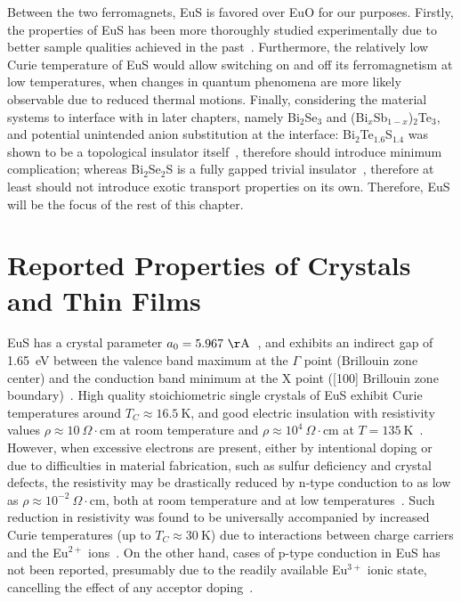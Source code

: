 Between the two ferromagnets, EuS is favored over EuO for our purposes. Firstly, the properties of EuS has been more thoroughly studied experimentally due to better sample qualities achieved in the past~\cite{EuS_band_th2}. Furthermore, the relatively low Curie temperature of EuS would allow switching on and off its ferromagnetism at low temperatures, when changes in quantum phenomena are more likely observable due to reduced thermal motions. Finally, considering the material systems to interface with in later chapters, namely Bi$_2$Se$_3$ and (Bi$_x$Sb$_{1-x}$)$_2$Te$_3$, and potential unintended anion substitution at the interface: Bi$_2$Te$_{1.6}$S$_{1.4}$ was shown to be a topological insulator itself~\cite{BiTeS}, therefore should introduce minimum complication; whereas Bi$_2$Se$_2$S is a fully gapped trivial insulator~\cite{BiSeS}, therefore at least should not introduce exotic transport properties on its own. Therefore, EuS will be the focus of the rest of this chapter.

\section{Reported Properties of Crystals and Thin Films}\label{sec:EuS_previous}
EuS has a crystal parameter $a_0=5.967~\mathrm\AA$~\cite{EuS_Shafer}, and exhibits an indirect gap of 1.65~eV between the valence band maximum at the $\Gamma$ point (Brillouin zone center) and the conduction band minimum at the X point ([100] Brillouin zone boundary)~\cite{EuX_absorption, EuS_band_th1, EuS_band_th2}. High quality stoichiometric single crystals of EuS exhibit Curie temperatures around $T_C\approx16.5~\mathrm{K}$, and good electric insulation with resistivity values $\rho\approx10~\Omega\cdot\mathrm{cm}$ at room temperature and $\rho\approx10^4~\Omega\cdot\mathrm{cm}$ at $T=135~\mathrm{K}$~\cite{EuS_Shafer}. However, when excessive electrons are present, either by intentional doping or due to difficulties in material fabrication, such as sulfur deficiency and crystal defects, the resistivity may be drastically reduced by n-type conduction to as low as $\rho\approx10^{-2}~\Omega\cdot\mathrm{cm}$, both at room temperature and at low temperatures~\cite{EuS_LaDoped, EuS_ntype}. Such reduction in resistivity was found to be universally accompanied by increased Curie temperatures (up to $T_C\approx30~\mathrm{K}$) due to interactions between charge carriers and the Eu$^{2+}$ ions~\cite{EuS_TC_doping, EuS_ntype, EuX_doped_transport, EuX_RKKY}. On the other hand, cases of p-type conduction in EuS has not been reported, presumably due to the readily available Eu$^{3+}$ ionic state, cancelling the effect of any acceptor doping~\cite{EuX_doped_transport}.

